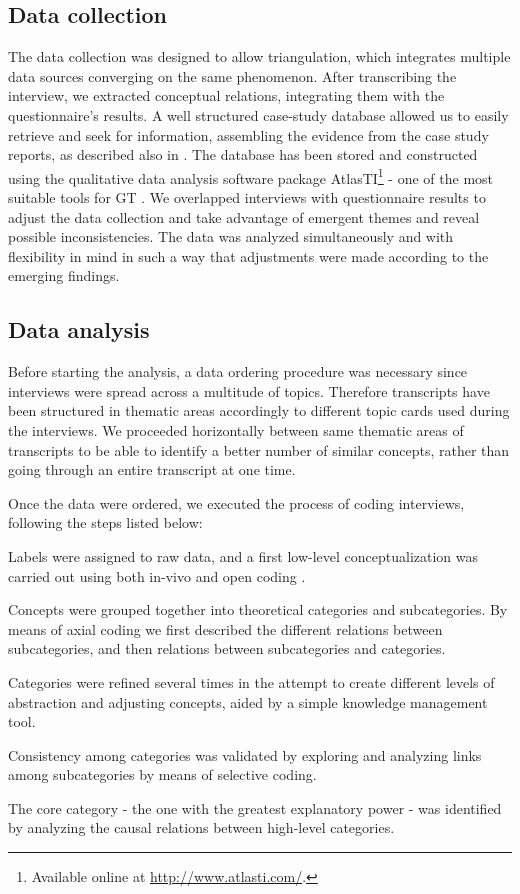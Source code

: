 \documentclass[10pt,journal,letterpaper,compsoc]{IEEEtran}
\begin{document}
\subsection{Data collection}
The data collection was designed to allow triangulation, which integrates 
multiple data sources converging on the same phenomenon. After transcribing the 
interview, we extracted conceptual relations, integrating them with the 
questionnaire's results. A well structured case-study database allowed us to 
easily retrieve and seek for information, assembling the evidence from the case 
study reports, as described also in \cite{Yin1994}. The database has been stored 
and constructed using the qualitative data analysis software package 
AtlasTI\footnote{Available online at \url{http://www.atlasti.com/}.} - one of 
the most suitable tools for GT \cite{Coleman2007}. 
We overlapped interviews with questionnaire results to adjust the data 
collection and take advantage of emergent themes and reveal possible 
inconsistencies. The data was analyzed simultaneously and with flexibility in 
mind in such a way that adjustments were made according to the emerging 
findings.
\subsection{Data analysis}
Before starting the analysis, a data ordering procedure was necessary since 
interviews were spread across a multitude of topics. Therefore transcripts have 
been structured in thematic areas accordingly to different topic cards used 
during the interviews. We proceeded horizontally between same thematic areas of 
transcripts to be able to identify a better number of similar concepts, rather 
than going through an entire transcript at one time.

Once the data were ordered, we executed the process of coding interviews, 
following the steps listed below: 


\begin{compactitem}

\item Labels were assigned to raw data, and a first low-level conceptualization 
was carried out using both in-vivo and open coding \cite{ColinRobson2009}.
\item Concepts were grouped together into theoretical categories and 
subcategories. By means of axial coding we first described the different 
relations between subcategories, and then relations between subcategories and 
categories.
\item Categories were refined several times in the attempt to create different 
levels of abstraction and adjusting concepts, aided by a simple knowledge 
management tool.
\item Consistency among categories was validated by exploring and analyzing 
links among subcategories by means of selective coding.
\item The core category - the one with the greatest explanatory power - was 
identified by analyzing the causal relations between high-level categories.
\end{compactitem}
\end{document}

